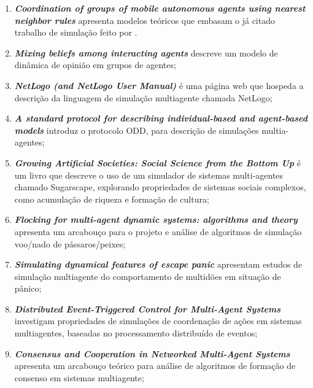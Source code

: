 \begin{enumerate}
\item \textit{\textbf{Coordination of groups of mobile autonomous agents using nearest neighbor rules}} \citep{jadbabaie_coordination_2003}
apresenta modelos teóricos que embasam o já citado trabalho de simulação feito por \citet{vicsek_novel_1995}.

\item \textit{\textbf{Mixing beliefs among interacting agents}} \citep{deffuant_mixing_2000} descreve um modelo de dinâmica de opinião em grupos de agentes;

\item \textit{\textbf{NetLogo (and NetLogo User Manual)}}  \citep{wilensky_netlogo_1999} é uma página web que hospeda a descrição da linguagem de simulação multiagente chamada NetLogo;


\item \textit{\textbf{A standard protocol for describing individual-based and agent-based models}} \citep{grimm_standard_2006} introduz o protocolo ODD, para descrição de simulações multia-agentes;

\item \textit{\textbf{Growing Artificial Societies: Social Science from the Bottom Up}} \citep{epstein_growing_1996} é um livro que descreve o uso de um simulador de sistemas multi-agentes chamado Sugarscape, explorando propriedades de sistemas sociais complexos, como acumulação de riqueza e formação de cultura;

\item \textit{\textbf{Flocking for multi-agent dynamic systems: algorithms and theory}} \citep{olfati-saber_flocking_2006} apresenta um arcabouço para o projeto e análise de algoritmos de simulação voo/nado de pássaros/peixes;

\item \textit{\textbf{Simulating dynamical features of escape panic}} \citep{helbing_simulating_2000} apresentam estudos de simulação multiagente do comportamento de multidões em situação de pânico;

\item \textit{\textbf{Distributed Event-Triggered Control for Multi-Agent Systems}} \citep{dimarogonas_distributed_2012} investigam propriedades de simulações de coordenação de ações em sistemas multiagentes, baseadas no processamento distribuído de eventos;

\item \textit{\textbf{Consensus and Cooperation in Networked Multi-Agent Systems}} \citep{olfati-saber_consensus_2007}  apresenta um arcabouço teórico para análise de algoritmos de formação de consenso em sistemas multiagente;


\end{enumerate}
